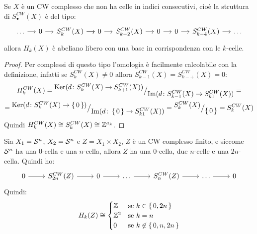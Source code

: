 \begin{osservation}
  Se $ X $ è un CW complesso che non ha celle in indici consecutivi,
  cioè la struttura di $ S_\bullet^{CW}(X) $ è del tipo:
  \[
    \begin{tikzcd}[nodes = {column sep = 12pt}]
      \dots \rar & \rar 0 & \rar S_k^{CW}(X) \rar & 0 \rar &   S_{k-2}^{CW}(X) \rar & 0 \rar & 0 \rar & S_{k-4}^{CW}(X) \rar & \dots
    \end{tikzcd}
  \]
  allora $ H_k(X) $ è abeliano libero con una base in corrispondenza
  con le $ k $-celle.
\end{osservation}
\begin{proof}
  Per complessi di questo tipo l'omologia è facilmente calcolabile
  con la definizione, infatti se $ S_k^{CW}(X) \not = 0 $ allora
  $ S_{k-1}^{CW}(X) = S_{k-+}^{CW}(X) = 0 $:
  \begin{gather*}
    H^{CW}_k(X) = {^{\textstyle \mathrm{Ker}( d \colon  S_k^{CW}(X) \to  S_{k+1}^{CW}(X))}\big/_{\textstyle \mathrm{Im}( d \colon  S_{k-1}^{CW}(X) \to  S_{k1}^{CW}(X) )}} = \\
    =   {^{\textstyle \mathrm{Ker}( d \colon  S_k^{CW}(X) \to \set{0})}\big/_{\textstyle \mathrm{Im}( d \colon  \set{0} \to  S_{k1}^{CW}(X) )}} = {^{\textstyle S_k^{CW}(X)}\big/_{\textstyle \set{0}}} = S_k^{CW}(X)
  \end{gather*}
  Quindi $ H^{CW}_k(X) \cong S_k^{CW}(X) \cong \mathbb{Z}^{a_k} $.
\end{proof}
\begin{example}
  Sia $ X_1 = \mathcal{S}^{n} $, $ X_2 = \mathcal{S}^{n} $ e $ Z = X_1 \times X_2 $, $ Z $ è un CW
  complesso finito, e siccome $ \mathcal{S}^{n} $ ha una $ 0 $-cella e una $ n $-cella,
  allora $ Z $ ha una $ 0 $-cella, due $ n $-celle e una $ 2n $-cella.
  Quindi ho:
  \[
    \begin{tikzcd}
      0 \rar & S_{2n}^{CW}(Z) \rar & 0 \rar & \dots \rar & S_n^{CW}(Z) \rar & \dots \rar & 0
    \end{tikzcd}
  \]
  Quindi:
  \[
    H_k(Z) \cong
    \begin{cases}
      \mathbb{Z} & \text{se } k \in \set{0, 2n} \\
      \mathbb{Z}^2 & \text{se } k = n \\
      0 & \text{se } k \not \in \set{0, n, 2n}
    \end{cases}
  \]
\end{example}

